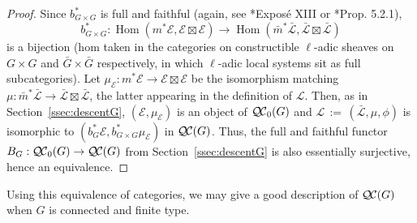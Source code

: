 \documentclass[CM,Submssn,SecEq]{degruyter-crelle} %
\theoremstyle{plain}
\theoremstyle{definition}
\theoremstyle{remark}
\DeclareMathOperator{\Hom}{Hom}
\newcommand{\ceq}{{\, :=\, }}
\newcommand{\qcs}[1]{{\mathcal{#1}}}
\newcommand{\gqcs}[1]{{\mathcal{\bar #1}}}
\newcommand{\QC}{{\mathcal{Q\hskip-0.8pt C}}}
\newcommand{\bQC}{{\QC_0}}
\begin{document}
\begin{proof}
  Since $b_{G\times G}^*$ is full and faithful (again, see
\cite{deligne-katz:SGA7.2}*{Expos\'e XIII} or \cite{beilinson-bernstein-deligne:81a}*{Prop. 5.2.1}),
 \[
  b_{G\times G}^* : \Hom(m^*\qcs{E},\qcs{E}\boxtimes\qcs{E}) \to \Hom({\bar m}^*\gqcs{L},\gqcs{L}\boxtimes\gqcs{L})
 \]
  is a bijection
  (hom taken in the categories on constructible $\ell$-adic sheaves on
  $G\times G$ and ${\bar G}\times {\bar G}$ respectively,
  in which $\ell$-adic local systems sit as full subcategories).
  Let $\mu_\qcs{E} : m^*\qcs{E} \to \qcs{E}\boxtimes\qcs{E}$ be the isomorphism matching
  $\mu : {\bar m}^*\gqcs{L} \to \gqcs{L}\boxtimes\gqcs{L}$,
  the latter appearing in the definition of $\qcs{L}$.
  Then, as in Section~\ref{ssec:descentG}, $(\qcs{E},\mu_\qcs{E})$ is an object of $\bQC(G)$
  and $\qcs{L} \ceq (\gqcs{L},\mu,\phi)$ is isomorphic to $(b_G^*\qcs{E},b_{G\times G}^*\mu_\qcs{E})$ in $\QC(G)$.
  Thus, the full and faithful functor $B_G : \bQC(G) \to \QC(G)$ from Section~\ref{ssec:descentG}
  is also essentially surjective, hence an equivalence.
\end{proof}

Using this equivalence of categories, we may give a good description of $\QC(G)$ when $G$ is connected and finite type.
\end{document}
